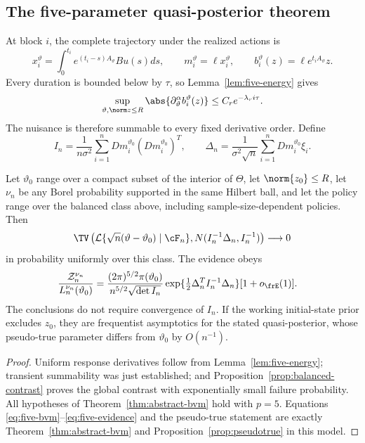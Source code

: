 \subsection{The five-parameter quasi-posterior theorem}

At block \(i\), the complete trajectory under the realized actions is
\[
 x_i^\vartheta=\int_0^{t_i}e^{(t_i-s)A_\vartheta}Bu(s)ds,
 \qquad m_i^\vartheta=\ell x_i^\vartheta,
 \qquad b_i^\vartheta(z)=\ell e^{t_iA_\vartheta}z.
\]
Every duration is bounded below by \(\tau\), so
Lemma~\ref{lem:five-energy} gives
\[
 \sup_{\vartheta,\norm z\le R}
 \abs{\partial_\vartheta^\alpha b_i^\vartheta(z)}
 \le C_re^{-\lambda_ri\tau}.
\]
The nuisance is therefore summable to every fixed derivative order.  Define
\[
 I_n=\frac1{n\sigma^2}\sum_{i=1}^n
 Dm_i^{\vartheta_0}(Dm_i^{\vartheta_0})^T,
 \qquad
 \Delta_n=\frac1{\sigma^2\sqrt n}
 \sum_{i=1}^nDm_i^{\vartheta_0}\xi_i.
\]

\begin{theorem}
\label{thm:lattice-bvm}
Let \(\vartheta_0\) range over a compact subset of the interior of \(\Theta\),
let \(\norm{z_0}\le R\), let \(\nu_n\) be any Borel probability supported in
the same Hilbert ball, and let the policy range over the balanced class above,
including sample-size-dependent policies.  Then
\begin{equation}
 \TV\left(
 \mathcal L\{\sqrt n(\vartheta-\vartheta_0)\mid\cF_n\},
 N(I_n^{-1}\Delta_n,I_n^{-1})
 \right)\longrightarrow0
 \label{eq:five-bvm}
\end{equation}
in probability uniformly over this class.  The evidence obeys
\begin{align}
 \frac{\mathcal Z_n^{\nu_n}}{L_n^{\nu_n}(\vartheta_0)}
 ={}&\frac{(2\pi)^{5/2}\pi(\vartheta_0)}{n^{5/2}\sqrt{\det I_n}}
 \exp\{\tfrac12\Delta_n^TI_n^{-1}\Delta_n\}
 [1+o_{\frE}(1)].
 \label{eq:five-evidence}
\end{align}
The conclusions do not require convergence of \(I_n\).  If the working
initial-state prior excludes \(z_0\), they are frequentist asymptotics for the
stated quasi-posterior, whose pseudo-true parameter differs from
\(\vartheta_0\) by \(O(n^{-1})\).
\end{theorem}

\begin{proof}
Uniform response derivatives follow from Lemma~\ref{lem:five-energy};
transient summability was just established; and
Proposition~\ref{prop:balanced-contrast} proves the global contrast with
exponentially small failure probability.  All hypotheses of
Theorem~\ref{thm:abstract-bvm} hold with \(p=5\).  Equations
\eqref{eq:five-bvm}--\eqref{eq:five-evidence} and the pseudo-true statement
are exactly Theorem~\ref{thm:abstract-bvm} and
Proposition~\ref{prop:pseudotrue} in this model.
\end{proof}

